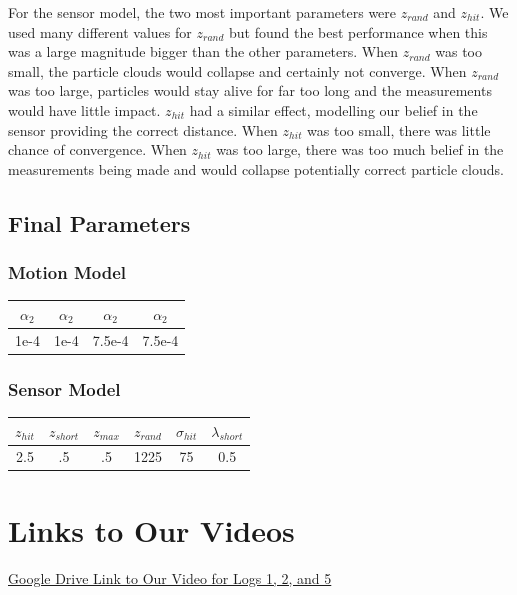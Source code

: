 \documentclass[12pt, a4paper]{article}
\begin{document}
\noindent For the sensor model, the two most important parameters were $z_{rand}$ and $z_{hit}$. We used many different values for $z_{rand}$ but found the best performance when this was a large magnitude bigger than the other parameters. When $z_{rand}$ was too small, the particle clouds would collapse and certainly not converge. When $z_{rand}$ was too large, particles would stay alive for far too long and the measurements would have little impact. $z_{hit}$ had a similar effect, modelling our belief in the sensor providing the correct distance. When $z_{hit}$ was too small, there was little chance of convergence. When $z_{hit}$ was too large, there was too much belief in the measurements being made and would collapse potentially correct particle clouds.

\subsection{Final Parameters}
\subsubsection{Motion Model}
\begin{center}
\begin{tabular}{||c |c| c| c||} 
  \hline
  $\alpha_2$ & $\alpha_2$ & $\alpha_2$ & $\alpha_2$ \\
  \hline
  1e-4 & 1e-4 & 7.5e-4 & 7.5e-4 \\
  \hline
\end{tabular}
\end{center}

\subsubsection{Sensor Model}
\begin{center}
\begin{tabular}{||c | c | c | c | c | c||} 
  \hline
  $z_{hit}$ & $z_{short}$ & $z_{max}$ & $z_{rand}$ & $\sigma_{hit}$ & $\lambda_{short}$ \\
  \hline
  2.5 & .5 & .5 & 1225 & 75 & 0.5 \\
  \hline
\end{tabular}
\end{center}
\section{Links to Our Videos}
\href{https://drive.google.com/drive/folders/1FlG3XrkM6avgEq5bGeyH-CDgz_LnASk3?usp=sharing}{Google Drive Link to Our Video for Logs 1, 2, and 5}
\end{document}
